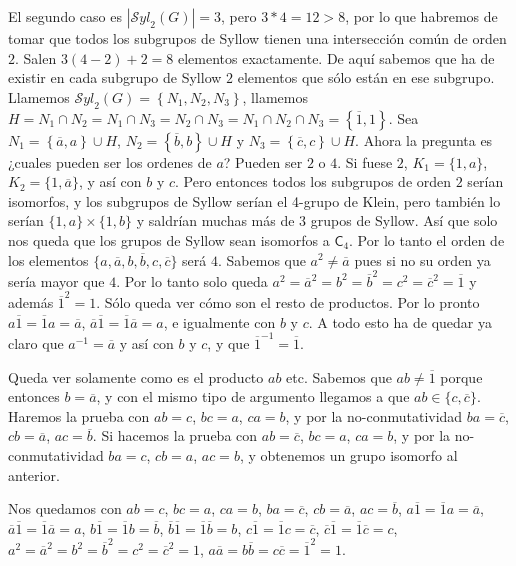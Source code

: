 \documentclass[12pt,a4paper,fleqn,spanish,final,openright]{extbook}
\theoremstyle{definition}
\theoremstyle{remark}
\begin{document}
    El segundo caso es $\left| {{\mathcal{S}yl}_{2}}(G)\right|=3$, pero $3*4=12 > 8$, 
por lo que habremos de tomar que todos los subgrupos de Syllow tienen una intersección 
común de orden $2$. Salen $3(4-2)+2=8$ elementos exactamente. De aquí sabemos 
que ha de existir en cada subgrupo de Syllow $2$ elementos que sólo están en ese subgrupo. 
Llamemos $ {{\mathcal{S}yl}_{2}}\left(G\right)=\left\{ N_1,N_2,N_3 \right\} $, 
llamemos 
$H = N_1 \cap N_2 = N_1 \cap N_3 = N_2 \cap N_3 = 
N_1 \cap N_2 \cap N_3 = \left\{ \overline{1},1 \right\}$. 
Sea $N_1=\left\{ \overline{a},a\right\}\cup H$, $N_2=\left\{\overline{b},b\right\}\cup H$ y 
$N_3=\left\{ \overline{c},c\right\}\cup H$. Ahora la pregunta es ¿cuales pueden ser los
ordenes de $a$? Pueden ser $2$ o $4$. Si fuese $2$, $K_1 = \{1,a\}$, $K_2 = \{1,\overline{a}\}$, 
y así con $b$ y $c$. Pero entonces todos los subgrupos de orden $2$ serían isomorfos, 
y los subgrupos de Syllow serían el 4-grupo de Klein, pero 
también lo serían $\{1,a\}\times\{1,b\}$ y saldrían muchas más de $3$ grupos de Syllow. 
Así que solo nos queda que los 
grupos de Syllow sean isomorfos a $\mathsf{C}_{4}$. 
Por lo tanto el orden de los elementos $\{a,\overline{a},b,\overline{b},c,\overline{c}\}$ 
será $4$. Sabemos que $a^2\neq\overline{a}$ pues si no su orden ya
sería mayor que $4$. Por lo tanto solo queda 
$a^2=\overline{a}^2=b^2=\overline{b}^2=c^2=\overline{c}^2=\overline{1}$ y 
además $\overline{1}^2=1$. Sólo queda ver cómo son el resto de productos. Por lo pronto
$a\overline{1}=\overline{1}a=\overline{a}$, $\overline{a}\overline{1}=\overline{1}\overline{a}=a$, 
e igualmente con $b$ y $c$. A todo esto ha de quedar ya claro que $a^{-1}=\overline{a}$ 
y así con $b$ y $c$, y que $\overline{1}^{-1}=\overline{1}$.
               
    Queda ver solamente como es el producto $ab$ etc. Sabemos que $ab\neq\overline{1}$ 
porque entonces $b=\overline{a}$, y con el mismo tipo de argumento llegamos a que 
$ab \in \{c,\overline{c}\}$. Haremos la prueba con $ab=c$, $bc=a$, $ca=b$, y por la 
no-conmutatividad $ba=\overline{c}$, $cb=\overline{a}$, $ac=\overline{b}$. 
Si hacemos la prueba con $ab=\overline{c}$, $bc=a$, $ca=b$, y por la no-conmutatividad  
$ba=c$, $cb=a$, $ac=b$, y obtenemos un grupo isomorfo al anterior.
    
    Nos quedamos con $ab=c$, $bc=a$, $ca=b$, $ba=\overline{c}$, $cb=\overline{a}$, 
$ac=\overline{b}$, $a\overline{1}=\overline{1}a=\overline{a}$, 
$\overline{a}\overline{1}=\overline{1}\overline{a}=a$, 
$b\overline{1}=\overline{1}b=\overline{b}$, 
$\overline{b}\overline{1}=\overline{1}\overline{b}=b$, 
$c\overline{1}=\overline{1}c=\overline{c}$, 
$\overline{c}\overline{1}=\overline{1}\overline{c}=c$, 
$a^2=\overline{a}^2=b^2=\overline{b}^2=c^2=\overline{c}^2=1$, 
$a\overline{a}=b\overline{b}=c\overline{c}=\overline{1}^2=1$.
    
\end{document}
